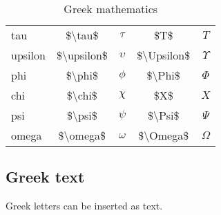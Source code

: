 \documentclass[10pt, letterpaper, twoside]{article}
\begin{document}
\begin{table}[H]
\begin{flushleft}
\begin{tabular}{lcccc}
tau     & \$\textbackslash tau\$     & $\tau$     & \$T\$                      & $T$ \\
upsilon & \$\textbackslash upsilon\$ & $\upsilon$ & \$\textbackslash Upsilon\$ & $\Upsilon$ \\
phi     & \$\textbackslash phi\$     & $\phi$     & \$\textbackslash Phi\$     & $\Phi$ \\
chi     & \$\textbackslash chi\$     & $\chi$     & \$X\$                      & $X$ \\
psi     & \$\textbackslash psi\$     & $\psi$     & \$\textbackslash Psi\$     & $\Psi$ \\
omega   & \$\textbackslash omega\$   & $\omega$   & \$\textbackslash Omega\$   & $\Omega$ \\
\bottomrule
\end{tabular}
\label{tab:greek_mathematics}
\caption{Greek mathematics}
\end{flushleft}
\end{table}

\newpage
\subsection{Greek text}\label{sec:greek_text}

Greek letters can be inserted as text.
\end{document}
